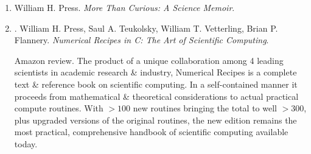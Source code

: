 \documentclass{article}
\begin{document}
\begin{enumerate}
	{\sc Saul A. Teukolsky} is H. A. Bethe Professor in Physics in the Radiophysics \& Space Research Department of Cornell University.

	{\sc William Vetterling} is a Research Fellow \& Director of the Image Science Laboratory at ZINK Imaging, LLC in Waltham, MA. His career includes eight years on the physics faculty at Harvard \& 20 years of numerical modeling \& laboratory research on digital imaging at Polaroid Corporation.

	{\sc Brian P. Flannery} is Science, Strategy \& Programs Manager at Exxon Mobil Corporation.

	\item {\sc William H. Press}. {\it More Than Curious: A Science Memoir}.

	\item \cite{Press_Teukolsky_Vetterling_Flannery_recipe_C}. {\sc William H. Press, Saul A. Teukolsky, William T. Vetterling, Brian P. Flannery}. {\it Numerical Recipes in C: The Art of Scientific Computing}. {}

	{\sf Amazon review.} The product of a unique collaboration among 4 leading scientists in academic research \& industry, Numerical Recipes is a complete text \& reference book on scientific computing. In a self-contained manner it proceeds from mathematical \& theoretical considerations to actual practical compute routines. With $> 100$ new routines bringing the total to well $> 300$, plus upgraded versions of the original routines, the new edition remains the most practical, comprehensive handbook of scientific computing available today.


\end{enumerate}
\end{document}
